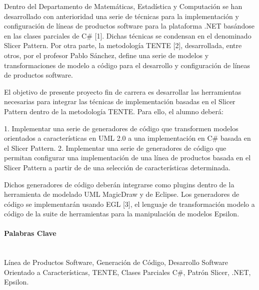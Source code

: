 


Dentro del Departamento de Matemáticas, Estadística y Computación se han desarrollado con anterioridad una serie de técnicas para la implementación y configuración de líneas de productos software para la plataforma .NET basándose en las clases parciales de C# [1]. Dichas técnicas se condensan en el denominado Slicer Pattern. Por otra parte, la metodología TENTE [2], desarrollada, entre otros, por el profesor Pablo Sánchez, define una serie de modelos y transformaciones de modelo a código para el desarrollo y configuración de líneas de productos software.

El objetivo de presente proyecto fin de carrera es desarrollar las herramientas necesarias para integrar las técnicas de implementación basadas en el Slicer Pattern dentro de la metodología TENTE. Para ello, el alumno deberá:

1. Implementar una serie de generadores de código que transformen modelos orientados a características en UML 2.0 a una implementación en C# basada en el Slicer Pattern.
2. Implementar una serie de generadores de código que permitan configurar una implementación de una línea de productos basada en el Slicer Pattern a partir de de una selección de características determinada.

Dichos generadores de código deberán integrarse como plugins dentro de la herramienta de modelado UML MagicDraw y de Eclipse. Los generadores de código se implementarán usando EGL [3], el lenguaje de transformación modelo a código de la suite de herramientas para la manipulación de modelos Epsilon.

\paragraph{Palabras Clave} \ \\

Línea de Productos Software, Generación de Código, Desarrollo Software Orientado a Características, TENTE, Clases Parciales C\#, Patrón Slicer, .NET, Epsilon.



 